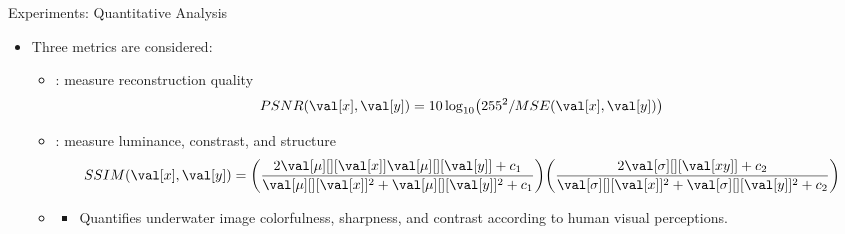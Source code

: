 \documentclass{cubeamer}
\begin{document}
\begin{frame}{Experiments: Quantitative Analysis}
    \begin{itemize}
        \item Three metrics are considered:
        \begin{itemize}
            \item {}: measure reconstruction quality
            $$
            PSNR(\val[x],\val[y]) = 10 \log_{10} \parens*{255^2 / MSE(\val[x],\val[y])}
            $$
            \item {}: measure luminance, constrast, and structure
            $$
            SSIM(\val[x], \val[y]) = \parens*{\frac{2 \val[\mu][][{\val[x]}] \val[\mu][][{\val[y]}] + c_1}{\val[\mu][][{\val[x]}]^2 + \val[\mu][][{\val[y]}]^2 + c_1}} \parens*{\frac{2 \val[\sigma][][{\val[xy]}]+ c_2}{\val[\sigma][][{\val[x]}]^2 + \val[\sigma][][{\val[y]}]^2 + c_2}}
            $$
            \item {} \cite{uiqm}
            \begin{itemize}
                \item Quantifies underwater image colorfulness, sharpness, and contrast according to human visual perceptions.
            \end{itemize}
        \end{itemize}
    \end{itemize}
\end{frame}
\end{document}
